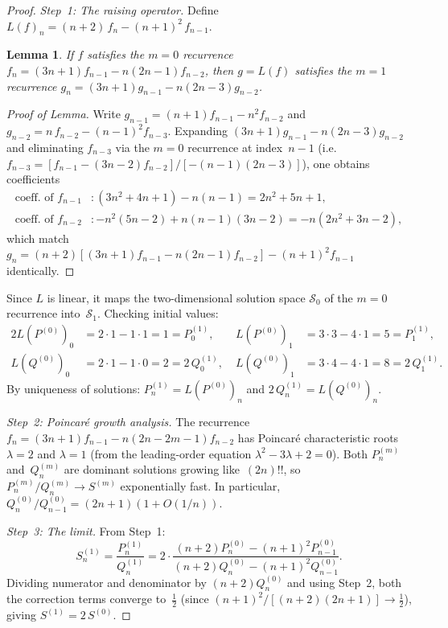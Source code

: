 \documentclass[11pt,a4paper]{article}
\newtheorem{lemma}[theorem]{Lemma}
\theoremstyle{definition}
\theoremstyle{remark}
\begin{document}
\begin{proof}
\emph{Step~1: The raising operator.}
Define $L(f)_n = (n{+}2)\,f_n - (n{+}1)^2\,f_{n-1}$.

\begin{lemma}\label{lem:shift}
If\/ $f$ satisfies the $m{=}0$ recurrence
$f_n = (3n{+}1)f_{n-1} - n(2n{-}1)f_{n-2}$,
then $g = L(f)$ satisfies the $m{=}1$ recurrence
$g_n = (3n{+}1)g_{n-1} - n(2n{-}3)g_{n-2}$.
\end{lemma}

\begin{proof}[Proof of Lemma]
Write $g_{n-1} = (n{+}1)f_{n-1} - n^2 f_{n-2}$ and
$g_{n-2} = n\,f_{n-2} - (n{-}1)^2 f_{n-3}$.
Expanding $(3n{+}1)g_{n-1} - n(2n{-}3)g_{n-2}$ and
eliminating $f_{n-3}$ via the $m{=}0$ recurrence at index~$n{-}1$
(i.e.\ $f_{n-3} = [f_{n-1} - (3n{-}2)f_{n-2}]/[{-}(n{-}1)(2n{-}3)]$),
one obtains coefficients
\begin{align*}
  \text{coeff.\ of } f_{n-1} &:
    (3n^2{+}4n{+}1) - n(n{-}1) = 2n^2{+}5n{+}1, \\
  \text{coeff.\ of } f_{n-2} &:
    {-}n^2(5n{-}2) + n(n{-}1)(3n{-}2) = {-}n(2n^2{+}3n{-}2),
\end{align*}
which match
$g_n = (n{+}2)[(3n{+}1)f_{n-1} - n(2n{-}1)f_{n-2}] - (n{+}1)^2 f_{n-1}$
identically.
\end{proof}

Since $L$ is linear, it maps the two-dimensional solution space
$\mathcal{S}_0$ of the $m{=}0$ recurrence into~$\mathcal{S}_1$.
Checking initial values:
\begin{alignat*}{2}
  L(P^{(0)})_0 &= 2\cdot 1 - 1\cdot 1 = 1 = P_0^{(1)},\;
  &L(P^{(0)})_1 &= 3\cdot 3 - 4\cdot 1 = 5 = P_1^{(1)},\\
  L(Q^{(0)})_0 &= 2\cdot 1 - 1\cdot 0 = 2 = 2\,Q_0^{(1)},\;
  &L(Q^{(0)})_1 &= 3\cdot 4 - 4\cdot 1 = 8 = 2\,Q_1^{(1)}.
\end{alignat*}
By uniqueness of solutions:
$P_n^{(1)} = L(P^{(0)})_n$ and $2\,Q_n^{(1)} = L(Q^{(0)})_n$.

\emph{Step~2: Poincar\'e growth analysis.}
The recurrence $f_n = (3n{+}1)f_{n-1} - n(2n{-}2m{-}1)f_{n-2}$
has Poincar\'e characteristic roots $\lambda = 2$ and $\lambda = 1$
(from the leading-order equation $\lambda^2 - 3\lambda + 2 = 0$).
Both $P_n^{(m)}$ and~$Q_n^{(m)}$ are dominant solutions growing
like~$(2n)!!$, so $P_n^{(m)}/Q_n^{(m)} \to S^{(m)}$ exponentially fast.
In particular, $Q_n^{(0)}/Q_{n-1}^{(0)} = (2n{+}1)(1 + O(1/n))$.

\emph{Step~3: The limit.}
From Step~1:
\[
  S_n^{(1)} = \frac{P_n^{(1)}}{Q_n^{(1)}}
  = 2\cdot\frac{(n{+}2)P_n^{(0)} - (n{+}1)^2 P_{n-1}^{(0)}}
              {(n{+}2)Q_n^{(0)} - (n{+}1)^2 Q_{n-1}^{(0)}}.
\]
Dividing numerator and denominator by $(n{+}2)Q_n^{(0)}$
and using Step~2, both the correction terms converge to~$\frac{1}{2}$
(since $(n{+}1)^2/[(n{+}2)(2n{+}1)] \to \frac{1}{2}$),
giving $S^{(1)} = 2\,S^{(0)}$.


\end{proof}
\end{document}
